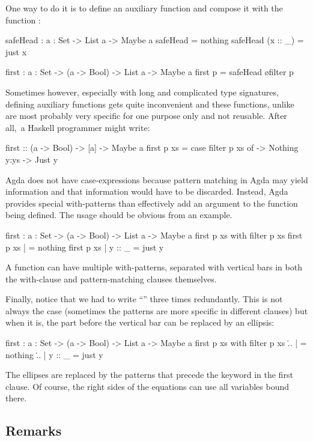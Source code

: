 One way to do it is to define an auxiliary function and compose it with the function
:
\begin{code}
  safeHead : {a : Set} -> List a -> Maybe a
  safeHead \NIL = nothing
  safeHead (x :: _) = just x
  
  first : {a : Set} -> (a -> Bool) -> List a -> Maybe a
  first p = safeHead \o filter p
\end{code}
Sometimes however, especially with long and complicated type signatures,
defining auxiliary functions gets quite inconvenient and these functions,
unlike  are most probably very specific for one purpose only
and not reusable. After all,~a Haskell programmer might write:
\begin{code}
  first :: (a -> Bool) -> [a] -> Maybe a
  first p xs = case filter p xs of
    \NIL -> Nothing
    y:ys -> Just y
\end{code}
Agda does not have case-expressions because pattern matching in Agda may yield
information and that information would have to be discarded. Instead, Agda provides special
with-patterns than effectively add an argument to the function being defined. The
usage should be obvious from an example.
\begin{code}
  first : {a : Set} -> (a -> Bool) -> List a -> Maybe a
  first p xs with filter p xs
  first p xs | \NIL = nothing
  first p xs | y :: _ = just y
\end{code}
A function can have multiple with-patterns, separated with vertical bars in both the
with-clause and pattern-matching clauses themselves.

Finally, notice that we had to write ``'' three times redundantly.
This is not always the case (sometimes the patterns are more specific in different
clauses) but when it is, the part before the vertical bar can be replaced by an ellipsis:
\begin{code}
  first : {a : Set} -> (a -> Bool) -> List a -> Maybe a
  first p xs with filter p xs
  \... | \NIL = nothing
  \... | y :: _ = just y
\end{code}
The ellipses are replaced by the patterns that precede the keyword  in the first
clause. Of course, the right sides of the equations can use all variables bound
there.

\subsection{Remarks}

